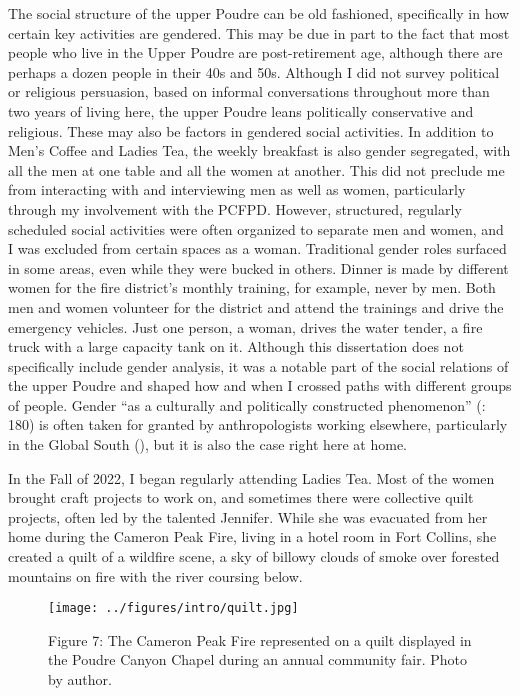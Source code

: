\documentclass[
]{article}
\begin{document}
The social structure of the upper Poudre can be old fashioned, specifically in how certain key activities are gendered. This may be due in part to the fact that most people who live in the Upper Poudre are post-retirement age, although there are perhaps a dozen people in their 40s and 50s. Although I did not survey political or religious persuasion, based on informal conversations throughout more than two years of living here, the upper Poudre leans politically conservative and religious. These may also be factors in gendered social activities. In addition to Men's Coffee and Ladies Tea, the weekly breakfast is also gender segregated, with all the men at one table and all the women at another. This did not preclude me from interacting with and interviewing men as well as women, particularly through my involvement with the PCFPD. However, structured, regularly scheduled social activities were often organized to separate men and women, and I was excluded from certain spaces as a woman. Traditional gender roles surfaced in some areas, even while they were bucked in others. Dinner is made by different women for the fire district's monthly training, for example, never by men. Both men and women volunteer for the district and attend the trainings and drive the emergency vehicles. Just one person, a woman, drives the water tender, a fire truck with a large capacity tank on it. Although this dissertation does not specifically include gender analysis, it was a notable part of the social relations of the upper Poudre and shaped how and when I crossed paths with different groups of people. Gender ``as a culturally and politically constructed phenomenon'' (: 180) is often taken for granted by anthropologists working elsewhere, particularly in the Global South (), but it is also the case right here at home.

In the Fall of 2022, I began regularly attending Ladies Tea. Most of the women brought craft projects to work on, and sometimes there were collective quilt projects, often led by the talented Jennifer. While she was evacuated from her home during the Cameron Peak Fire, living in a hotel room in Fort Collins, she created a quilt of a wildfire scene, a sky of billowy clouds of smoke over forested mountains on fire with the river coursing below.

\begin{figure}
\centering
\texttt{[image: ../figures/intro/quilt.jpg]}
\caption{Figure 7: The Cameron Peak Fire represented on a quilt displayed in the Poudre Canyon Chapel during an annual community fair. Photo by author.}
\end{figure}
\end{document}

